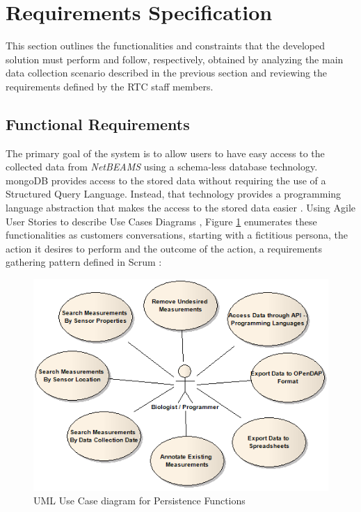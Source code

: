 \section{Requirements Specification}
\label{sec:requirements-specs}
This section outlines the functionalities and constraints that the developed
solution must perform and follow, respectively, obtained by analyzing the main
data collection scenario described in the previous section and reviewing the
requirements defined by the RTC staff members.

\subsection{Functional Requirements}
\label{sec:use-cases}

The primary goal of the system is to allow users to have easy access to the 
collected data from \emph{NetBEAMS} using a schema-less database technology.
mongoDB provides access to the stored data without requiring the use of 
a Structured Query Language. Instead, that technology provides a programming
language abstraction that makes the access to the stored data easier 
\cite{sn-programming-language}. Using Agile User Stories to describe Use 
Cases Diagrams \cite{use-cases-user-stories}, Figure 
\ref{fig:DSP-Data-Persistence-UseCases-Diagram-Users} enumerates these
functionalities as customers conversations, starting with a fictitious
persona, the action it desires to perform and the outcome of the action, a
requirements gathering pattern defined in Scrum \cite{agile-scrum}:

\begin{figure}[!b]
  \centering
  \includegraphics[scale=0.65]{../diagrams/DSP-Data-Persistence-UseCases-Diagram-Users}
  \caption{UML Use Case diagram for Persistence Functions}
  \label{fig:DSP-Data-Persistence-UseCases-Diagram-Users}
\end{figure}

